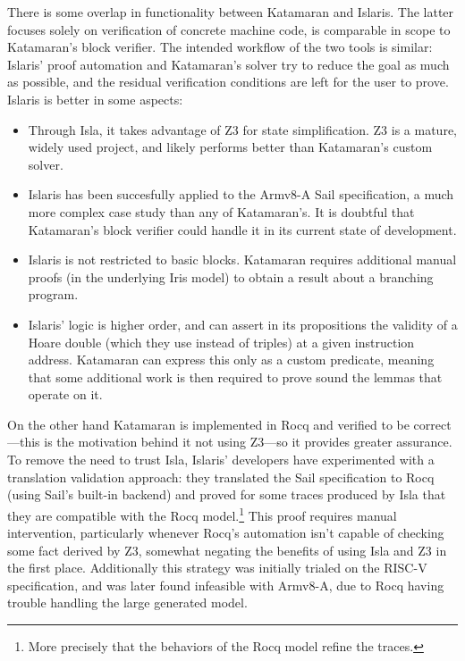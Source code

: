 There is some overlap in functionality between Katamaran and Islaris. The latter focuses solely on verification of concrete machine code, \ie is comparable in scope to Katamaran's block verifier. The intended workflow of the two tools is similar: Islaris' proof automation and Katamaran's solver try to reduce the goal as much as possible, and the residual verification conditions are left for the user to prove. Islaris is better in some aspects:
\begin{itemize}
\item Through Isla, it takes advantage of Z3 for state simplification. Z3 is a mature, widely used project, and likely performs better than Katamaran's custom solver.
\item Islaris has been succesfully applied to the Armv8-A Sail specification, a much more complex case study than any of Katamaran's. It is doubtful that Katamaran's block verifier could handle it in its current state of development.
\item Islaris is not restricted to basic blocks. Katamaran requires additional manual proofs (in the underlying Iris model) to obtain a result about a branching program.
\item Islaris' logic is higher order, and can assert in its propositions the validity of a Hoare double (which they use instead of triples) at a given instruction address. Katamaran can express this only as a custom predicate, meaning that some additional work is then required to prove sound the lemmas that operate on it.
\end{itemize}

On the other hand Katamaran is implemented in Rocq and verified to be correct---this is the motivation behind it not using Z3---so it provides greater assurance. To remove the need to trust Isla, Islaris' developers have experimented with a translation validation approach: they translated the Sail specification to Rocq (using Sail's built-in backend) and proved for some traces produced by Isla that they are compatible with the Rocq model.\footnote{More precisely that the behaviors of the Rocq model refine the traces.} This proof requires manual intervention, particularly whenever Rocq's automation isn't capable of checking some fact derived by Z3, somewhat negating the benefits of using Isla and Z3 in the first place. Additionally this strategy was initially trialed on the RISC-V specification, and was later found infeasible with Armv8-A, due to Rocq having trouble handling the large generated model.

